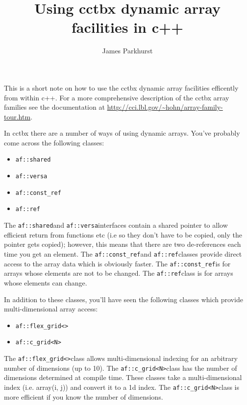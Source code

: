 \documentclass[a4paper,10pt]{article}
\title{Using cctbx dynamic array facilities in c++}
\author{James Parkhurst}
\begin{document}
\maketitle

\newcommand \afversa{\texttt{af::versa}}
\newcommand \afshared{\texttt{af::shared}}
\newcommand \afconstref{\texttt{af::const\_ref}}
\newcommand \afref{\texttt{af::ref}}
\newcommand \afflexgrid{\texttt{af::flex\_grid<>}}
\newcommand \afcgrid{\texttt{af::c\_grid<N>}}

This is a short note on how to use the cctbx dynamic array facilities efficently
from within c++. For a more comprehensive description of the cctbx array 
families see the documentation at \url{http://cci.lbl.gov/~hohn/array-family-tour.htm}.

In cctbx there are a number of ways of using dynamic arrays. You've probably
come across the following classes:

\begin{itemize}
  \item \afshared
  \item \afversa
  \item \afconstref
  \item \afref
\end{itemize}

The \afshared and \afversa interfaces contain a shared pointer
to allow efficient return from functions etc (i.e so they don't have to be
copied, only the pointer gets copied); however, this means that there are
two de-references each time you get an element. The \afconstref and
\afref classes provide direct access to the array data which is 
obviously faster. The \afconstref is for arrays whose elements are
not to be changed. The \afref class is for arrays whose elements can
change.

In addition to these classes, you'll have seen the following classes which
provide multi-dimensional array access:

\begin{itemize}
  \item \afflexgrid
  \item \afcgrid
\end{itemize}

The \afflexgrid class allows multi-dimensional indexing for an
arbitrary number of dimensions (up to 10). The \afcgrid class
has the number of dimensions determined at compile time. These classes
take a multi-dimensional index (i.e. array(i, j)) and convert it to a 1d index.
The \afcgrid class is more efficient if you know the number of
dimensions.
\end{document}
